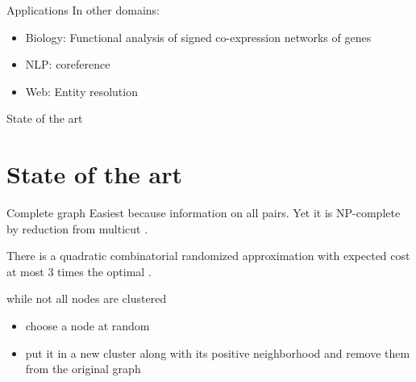 \documentclass[xcolor=svgnames,slideopt,A4,handout]{beamer}
\begin{document}
\begin{frame}{Applications}
		In other domains:
	\begin{itemize}
		\itemsep1pt\parskip0pt
		\item
			Biology: Functional analysis of signed co-expression networks of genes
			\autocite{Mason2009}
		\item
			NLP: coreference \autocite{graphicalCoreference04}
		\item
			Web: Entity resolution \autocite{DeDup09}
	\end{itemize}
\end{frame}
\begin{frame}{State of the art}
	\section{State of the art}
	
	\begin{block}{Complete graph}
		Easiest because information on all pairs. Yet it is NP-complete by
		reduction from multicut \autocite{Demaine2006}.

		There is a quadratic combinatorial randomized approximation with expected
		cost at most 3 times the optimal \autocite{Ailon2008}.

		while not all nodes are clustered
		\begin{itemize}
			\itemsep1pt\parskip0pt
			\item
				choose a node at random
			\item
				put it in a new cluster along with its positive neighborhood and remove
				them from the original graph
		\end{itemize}

	\end{block}
\end{frame}
\end{document}
